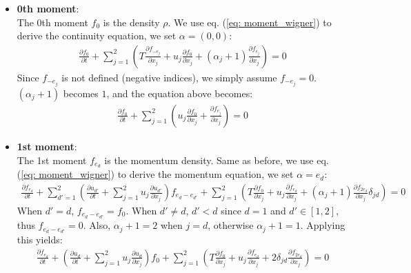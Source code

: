 \begin{itemize}
    \item \textbf{0th moment}: \\
    The 0th moment $f_0$ is the density $\rho$. We use eq. (\ref{eq: moment_wigner}) to derive the continuity equation, we set $\alpha = (0, 0)$:
    \begin{gather}
        \frac{\partial f_{0}}{\partial t} + \sum_{j=1}^{2} \left( T \frac{\partial f_{-e_j}}{\partial x_j} + u_j \frac{\partial f_{0}}{\partial x_j} + (\alpha_j + 1) \frac{\partial f_{e_j}}{\partial x_j} \right) = 0
    \end{gather}
    Since $f_{-e_j}$ is not defined (negative indices), we simply assume $f_{-e_j} = 0$. $(\alpha_j + 1)$ becomes $1$, and the equation above becomes:
    \begin{gather}
        \frac{\partial f_{0}}{\partial t} + \sum_{j=1}^{2} \left( u_j \frac{\partial f_{0}}{\partial x_j} + \frac{\partial f_{e_j}}{\partial x_j} \right) = 0 \label{eq: a1}
    \end{gather}

    \item \textbf{1st moment}: \\
    The 1st moment $f_{e_d}$ is the momentum density. Same as before, we use eq. (\ref{eq: moment_wigner}) to derive the momentum equation, we set $\alpha = e_d$:
    \begin{gather}
        \frac{\partial f_{e_d}}{\partial t} + \sum_{d'=1}^{2} \left( \frac{\partial u_{d'}}{\partial t} + \sum_{j=1}^{2} u_j \frac{\partial u_{d'}}{\partial x_j} \right) f_{e_d - e_{d'}} + \sum_{j=1}^{2} \left( T \frac{\partial f_{0}}{\partial x_j} + u_j \frac{\partial f_{e_d}}{\partial x_j} + (\alpha_j + 1) \frac{\partial f_{2 e_d}}{\partial x_j} \delta_{j d} \right) = 0
    \end{gather}
    When $d' = d$, $f_{e_d - e_{d'}} = f_{0}$. When $d' \neq d$, $d'<d$ since $d=1$ and $d'\in[1,2]$, thus $f_{e_d - e_{d'}} = 0$. Also, $\alpha_j + 1 = 2$ when \( j = d \), otherwise $\alpha_j + 1 = 1$.
    Applying this yields:
    \begin{gather}        
        \frac{\partial f_{e_d}}{\partial t} + \left( \frac{\partial u_d}{\partial t} + \sum_{j=1}^{2} u_j \frac{\partial u_d}{\partial x_j} \right) f_{0} + \sum_{j=1}^{2} \left( T \frac{\partial f_{0}}{\partial x_j} + u_j \frac{\partial f_{e_d}}{\partial x_j} + 2 \delta_{j d} \frac{\partial f_{2 e_d}}{\partial x_j} \right) = 0 \label{eq: a2}
    \end{gather}


\end{itemize}
